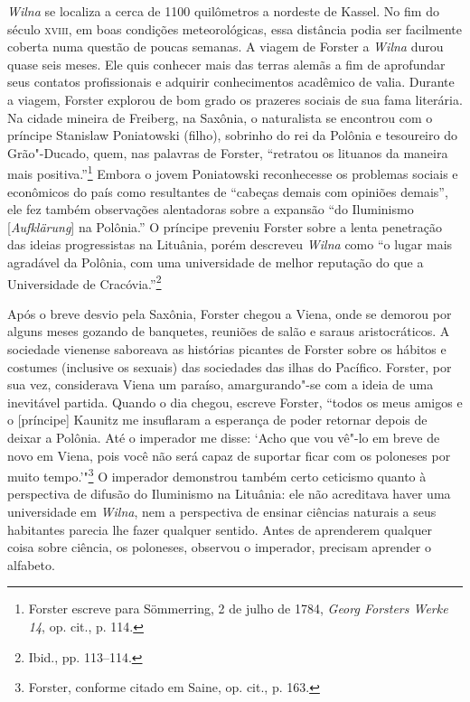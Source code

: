 \textit{Wilna} se localiza a cerca de 1100 quilômetros a nordeste de Kassel. No
fim do século \textsc{xviii}, em boas condições meteorológicas, essa distância podia
ser facilmente coberta numa questão de poucas semanas. A viagem de
Forster a \textit{Wilna} durou quase seis meses. Ele quis conhecer mais das
terras alemãs a fim de aprofundar seus contatos profissionais e adquirir
conhecimentos acadêmico de valia. Durante a viagem, Forster explorou de
bom grado os prazeres sociais de sua fama literária. Na cidade mineira
de Freiberg, na Saxônia, o naturalista se encontrou com o príncipe
Stanislaw Poniatowski (filho), sobrinho do rei da Polônia e tesoureiro
do Grão"-Ducado, quem, nas palavras de Forster, ``retratou os lituanos da
maneira mais positiva.''\footnote{Forster escreve para Sömmerring, 2 de julho de 1784, \textit{Georg Forsters Werke 14}, op. cit., p. 114.} Embora o jovem Poniatowski reconhecesse os problemas sociais e
econômicos do país como resultantes de ``cabeças demais com opiniões
demais'', ele fez também observações alentadoras sobre a expansão ``do
Iluminismo {[}\textit{Aufklärung}{]} na Polônia.'' O príncipe preveniu
Forster sobre a lenta penetração das ideias progressistas na Lituânia,
porém descreveu \textit{Wilna} como ``o lugar mais agradável da Polônia, com uma
universidade de melhor reputação do que a Universidade de
Cracóvia.''\footnote{Ibid., pp. 113--114.}

%

Após o breve desvio pela Saxônia, Forster chegou a Viena, onde se
demorou por alguns meses gozando de banquetes, reuniões de salão e
saraus aristocráticos. A sociedade vienense saboreava as histórias
picantes de Forster sobre os hábitos e costumes (inclusive os sexuais)
das sociedades das ilhas do Pacífico. Forster, por sua vez, considerava
Viena um paraíso, amargurando"-se com a ideia de uma inevitável partida.
Quando o dia chegou, escreve Forster, ``todos os meus amigos e o
{[}príncipe{]} Kaunitz me insuflaram a esperança de poder retornar
depois de deixar a Polônia. Até o imperador me disse: `Acho que vou
vê"-lo em breve de novo em Viena, pois você não será capaz de suportar
ficar com os poloneses por muito tempo.'"\footnote{Forster, conforme citado em Saine, op. cit., p. 163.} O imperador demonstrou também certo ceticismo quanto à perspectiva de difusão do Iluminismo na
Lituânia: ele não acreditava haver uma universidade em \textit{Wilna}, nem a
perspectiva de ensinar ciências naturais a seus habitantes parecia lhe
fazer qualquer sentido. Antes de aprenderem qualquer coisa sobre
ciência, os poloneses, observou o imperador, precisam aprender o
alfabeto.

